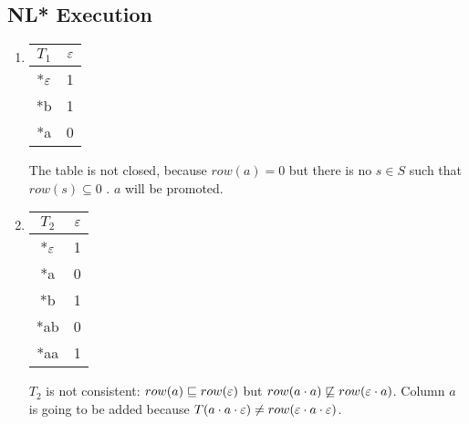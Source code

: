\subsection{NL* Execution}
\label{sec:nl-exec}
\begin{enumerate}
  \item \begin{minipage}{0.3\textwidth}
          \begin{tabular}{c||c}
            $T_1$              & $\varepsilon$ \\
            \hline\hline
            *$\varepsilon$\footnotemark & 1    \\
            \hline\hline
            *b                 & 1    \\
            *a                 & 0    \\
          \end{tabular}
        \end{minipage}  \quad
        \begin{minipage}{0.6\textwidth}
          The table is not closed, because $row(a) = 0$ but there is no $s \in S$ such that $row(s) \subseteq 0$ . $a$ will be promoted.
        \end{minipage}

  \item \begin{minipage}{0.3\textwidth}
          \begin{tabular}{c||c}
            $T_2$ & $\varepsilon$ \\
            \hline\hline
            *$\varepsilon$ & 1    \\
            *a    & 0    \\
            \hline\hline
            *b    & 1    \\
            *ab   & 0    \\
            *aa   & 1    \\
          \end{tabular}
        \end{minipage}\quad
        \begin{minipage}{0.6\textwidth}
          $T_2$ is not consistent: $row(a) \sqsubseteq row(\varepsilon)$ but $row(a \cdot a) \not\sqsubseteq row(\varepsilon \cdot a)$. Column $a$ is going to be added because $T(a \cdot a \cdot \varepsilon) \neq row(\varepsilon \cdot a \cdot \varepsilon)$.
        \end{minipage}


\end{enumerate}
